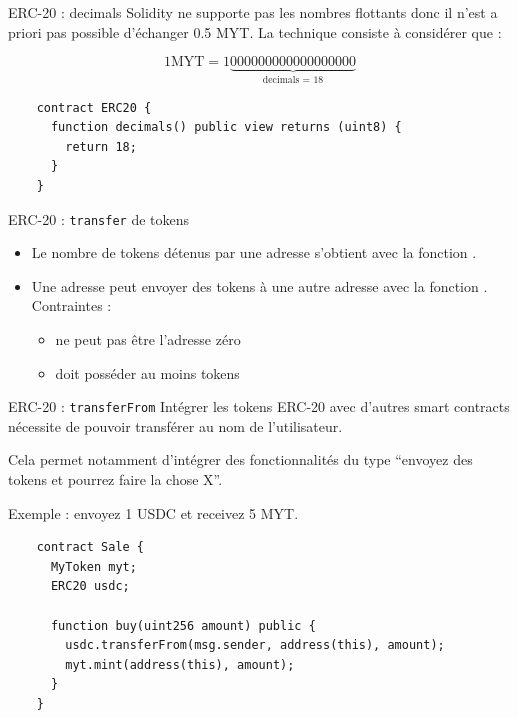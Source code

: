 \begin{frame}[fragile]{ERC-20 : decimals}
  Solidity ne supporte pas les nombres flottants donc il n'est a priori pas possible d'échanger 0.5 MYT. La technique consiste à considérer que :

  $$1\text{MYT} = 1\underbrace{000000000000000000}_\text{decimals = 18}$$

  \begin{verbatim}
    contract ERC20 {
      function decimals() public view returns (uint8) {
        return 18;
      }
    }
  \end{verbatim}
\end{frame}

\begin{frame}[fragile]{ERC-20 : \texttt{transfer} de tokens}
  \begin{itemize}
    \item Le nombre de tokens détenus par une adresse s'obtient avec la fonction .
    \item Une adresse peut envoyer des tokens à une autre adresse avec la fonction . Contraintes :\begin{itemize}
            \item {} ne peut pas être l'adresse zéro
            \item {} doit posséder au moins  tokens
          \end{itemize}
  \end{itemize}
\end{frame}

\begin{frame}[fragile]{ERC-20 : \texttt{transferFrom}}
  Intégrer les tokens ERC-20 avec d'autres smart contracts nécessite de pouvoir transférer au nom de l'utilisateur.

  Cela permet notamment d'intégrer des fonctionnalités du type \enquote{envoyez des tokens et pourrez faire la chose X}.

  Exemple : envoyez 1 USDC et receivez 5 MYT.

  \begin{verbatim}
    contract Sale {
      MyToken myt;
      ERC20 usdc;

      function buy(uint256 amount) public {
        usdc.transferFrom(msg.sender, address(this), amount);
        myt.mint(address(this), amount);
      }
    }
  \end{verbatim}
\end{frame}

